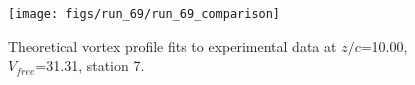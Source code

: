 \begin{figure}[H]
\centering
\texttt{[image: figs/run\_69/run\_69\_comparison]}
\caption{Theoretical vortex profile fits to experimental data at $z/c$=10.00, $V_{free}$=31.31, station 7.}
\label{fig:run_69_comparison}
\end{figure}


